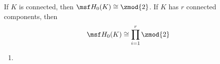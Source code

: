 \begin{problem}[16.8]
  If $K$ is connected, then $\msf H_0(K) \cong \zmod{2}$. If $K$ has $r$
  connected components, then
  \[
    \msf H_0(K)\cong \prod_{i=1}^r \zmod{2}
  \]
\end{problem}
\begin{solution}
  \begin{enumerate}
    \item
  \end{enumerate}
\end{solution}

